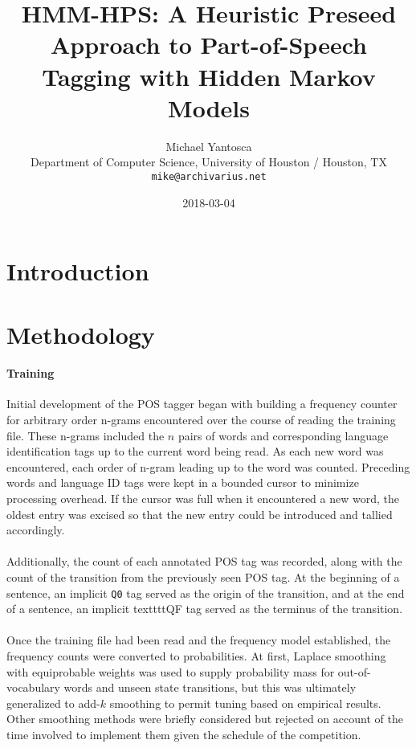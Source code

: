 \documentclass[11pt,a4paper]{article}
\title{HMM-HPS: A Heuristic Preseed Approach to Part-of-Speech Tagging with Hidden Markov Models}
\author{Michael Yantosca \\
  Department of Computer Science, University of Houston / Houston, TX \\
  {\tt mike@archivarius.net} \\}
\date{2018-03-04}
\begin{document}
\maketitle
\begin{abstract}
\end{abstract}

\section{Introduction}

\section{Methodology}

\paragraph{Training}
Initial development of the POS tagger began with building a frequency counter for
arbitrary order n-grams encountered over the course of reading the training file.
These n-grams included the $n$ pairs of words and corresponding language identification
tags up to the current word being read. As each new word was encountered, each
order of n-gram leading up to the word was counted. Preceding words and language ID
tags were kept in a bounded cursor to minimize processing overhead. If the cursor
was full when it encountered a new word, the oldest entry was excised so that the
new entry could be introduced and tallied accordingly.

\paragraph{}
Additionally, the count of each annotated POS tag was recorded, along with the count
of the transition from the previously seen POS tag. At the beginning of a sentence,
an implicit \texttt{Q0} tag served as the origin of the transition, and at the end
of a sentence, an implicit textttt{QF} tag served as the terminus of the transition.

\paragraph{}
Once the training file had been read and the frequency model established,
the frequency counts were converted to probabilities. At first, Laplace smoothing
\cite[47]{JurafskyMartin}
with equiprobable weights was used to supply probability mass for out-of-vocabulary
words and unseen state transitions, but this was ultimately generalized to add-$k$
smoothing \cite[49]{JurafskyMartin} to permit tuning based on empirical results.
Other smoothing methods were briefly considered but rejected on account of the time
involved to implement them given the schedule of the competition.
\end{document}
